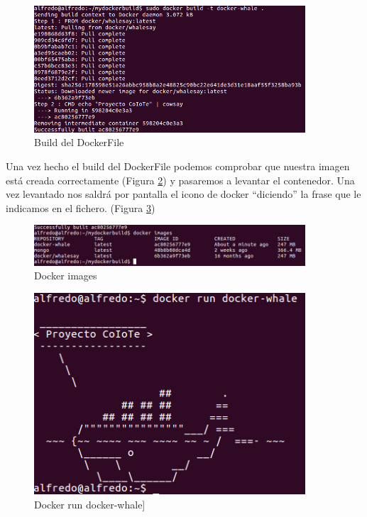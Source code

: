 \begin{figure}[htb]
\begin{center}
\includegraphics[width=0.90\textwidth]{./setup/DockerBuildWale}
\caption{Build del DockerFile}
\label{Build:BuildDockerFile}
\end{center}
\end{figure}
 
Una vez hecho el build del DockerFile podemos comprobar que nuestra imagen está creada correctamente (Figura \ref{Imag:ImageWhale}) y pasaremos a levantar el contenedor. Una vez levantado nos saldrá por pantalla el icono de docker “diciendo” la frase que le indicamos en el fichero. (Figura \ref{Run:RunWhale}) 

\begin{figure}[htb]
\begin{center}
\includegraphics[width=0.90\textwidth]{./setup/DockerImagesWhale}
\caption{Docker images}
\label{Imag:ImageWhale}
\end{center}
\end{figure}
\pagebreak

\begin{figure}[htb]
\begin{center}
\includegraphics[width=0.90\textwidth]{./setup/DockerRunWhale}
\caption{Docker run docker-whale]}
\label{Run:RunWhale}
\end{center}
\end{figure}

